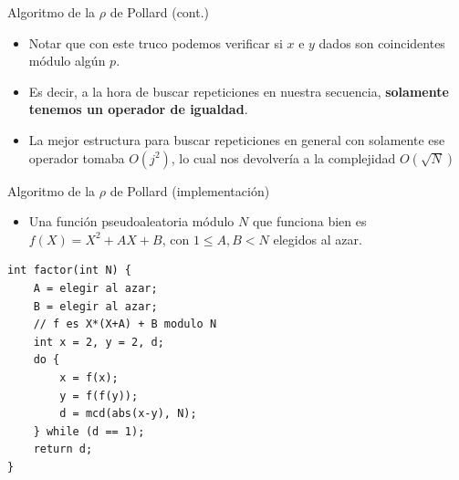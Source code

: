 \documentclass{beamer}
\begin{document}
\begin{frame}{Algoritmo de la $\rho$ de Pollard (cont.)}
    \begin{itemize}
      \item Notar que con este truco podemos verificar si $x$ e $y$ dados son coincidentes módulo algún $p$.
      \item Es decir, a la hora de buscar repeticiones en nuestra secuencia, \textbf{solamente tenemos un operador de igualdad}.
      \item La mejor estructura para buscar repeticiones en general con solamente ese operador tomaba $O(j^2)$, lo cual nos devolvería a la complejidad $O(\sqrt{N})$
      \pause
    \end{itemize}
\end{frame}

\begin{frame}[fragile]{Algoritmo de la $\rho$ de Pollard (implementación)}
    \begin{itemize}
      \item Una función pseudoaleatoria módulo $N$ que funciona bien es $f(X) = X^2 + AX + B$, con $1 \leq A,B < N$ elegidos al azar.
    \end{itemize}      

\small
\begin{verbatim}
int factor(int N) {
    A = elegir al azar;
    B = elegir al azar;
    // f es X*(X+A) + B modulo N
    int x = 2, y = 2, d;
    do {
        x = f(x);
        y = f(f(y));
        d = mcd(abs(x-y), N);
    } while (d == 1);
    return d;
}\end{verbatim}

\end{frame}
\end{document}
